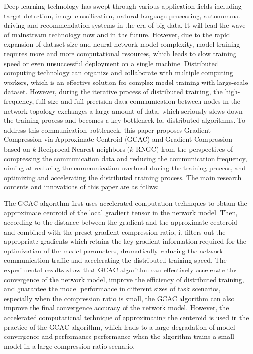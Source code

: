 
Deep learning technology has swept through various application fields including target detection, image classification, natural language processing, autonomous driving and recommendation systems in the era of big data.
It will lead the wave of mainstream technology now and in the future.
However, due to the rapid expansion of dataset size and neural network model complexity, model training requires more and more computational resources, which leads to slow 
training speed or even unsuccessful deployment on a single machine.
Distributed computing technology can organize and collaborate with multiple computing workers, which is an effective solution for complex model training with large-scale dataset.
However, during the iterative process of distributed training, the high-frequency, full-size and full-precision data communication between nodes in the network topology exchanges a large amount of data, which seriously slows down the training process and becomes a key bottleneck for distributed algorithms.
To address this communication bottleneck, this paper proposes Gradient Compression via Approximate Centroid (GCAC) and Gradient Compression based on $k$-Reciprocal Nearest neighbors ($k$-RNGC) from the perspectives of compressing the communication data and reducing the communication frequency, aiming at reducing the communication overhead during the training process, and optimizing and accelerating the distributed training process.
The main research contents and innovations of this paper are as follws:

The GCAC algorithm first uses accelerated computation techniques to obtain the approximate centroid of the local gradient tensor in the network model.
Then, according to the distance between the gradient and the approximate centeroid and combined with the preset gradient compression ratio, 
it filters out the appropriate gradients which retains the key gradient information required for the optimization of the model parameters, 
dramatically reducing the network communication traffic and accelerating the distributed training speed.
The experimental results show that 
GCAC algorithm can effectively accelerate the convergence of the network model, 
improve the efficiency of distributed training, 
and guarantee the model performance in different sizes of task scenarios, 
especially when the compression ratio is small, the GCAC algorithm can also improve the final convergence accuracy of the network model.
However, the accelerated computational technique of approximating the centeroid is used in the practice of the GCAC algorithm, which leads to a large degradation of model convergence and performance performance when the algorithm trains a small model in a large compression ratio scenario.

